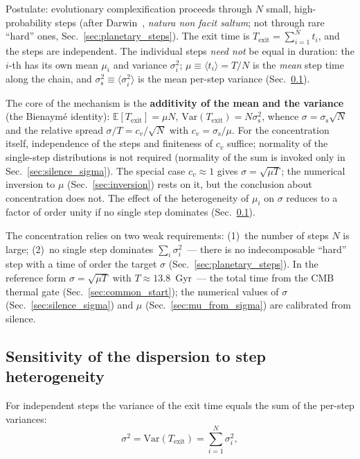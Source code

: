 \documentclass[11pt,a4paper]{article}
\begin{document}
Postulate: evolutionary complexification proceeds through $N$ small, high-probability steps (after Darwin~\cite{Darwin1859}, \emph{natura non facit saltum}; not through rare ``hard'' ones, Sec.~\ref{sec:planetary_steps}). The exit time is $T_{\mathrm{exit}} = \sum_{i=1}^{N} t_i$, and the steps are independent. The individual steps \emph{need not} be equal in duration: the $i$-th has its own mean $\mu_i$ and variance $\sigma_i^2$; $\mu \equiv \langle t_i\rangle = T/N$ is the \emph{mean} step time along the chain, and $\sigma_{\mathrm{s}}^2 \equiv \langle\sigma_i^2\rangle$ is the mean per-step variance (Sec.~\ref{sec:heterogeneity}).

The core of the mechanism is the \textbf{additivity of the mean and the variance} (the Bienaymé identity): $\mathbb{E}[T_{\mathrm{exit}}] = \mu N$, $\mathrm{Var}(T_{\mathrm{exit}}) = N\sigma_{\mathrm{s}}^2$, whence $\sigma = \sigma_{\mathrm{s}}\sqrt{N}$ and the relative spread $\sigma/T = c_v/\sqrt{N}$ with $c_v = \sigma_{\mathrm{s}}/\mu$. For the concentration itself, independence of the steps and finiteness of $c_v$ suffice; normality of the single-step distributions is not required (normality of the sum is invoked only in Sec.~\ref{sec:silence_sigma}). The special case $c_v \approx 1$ gives $\sigma = \sqrt{\mu T}$; the numerical inversion to $\mu$ (Sec.~\ref{sec:inversion}) rests on it, but the conclusion about concentration does not. The effect of the heterogeneity of $\mu_i$ on $\sigma$ reduces to a factor of order unity if no single step dominates (Sec.~\ref{sec:heterogeneity}).

The concentration relies on two weak requirements: (1)~the number of steps $N$ is large; (2)~no single step dominates $\sum_i\sigma_i^2$~--- there is no indecomposable ``hard'' step with a time of order the target $\sigma$ (Sec.~\ref{sec:planetary_steps}). In the reference form $\sigma = \sqrt{\mu T}$ with $T \approx 13.8$~Gyr~--- the total time from the CMB thermal gate (Sec.~\ref{sec:common_start}); the numerical values of $\sigma$ (Sec.~\ref{sec:silence_sigma}) and $\mu$ (Sec.~\ref{sec:mu_from_sigma}) are calibrated from silence.

\subsection{Sensitivity of the dispersion to step heterogeneity}
\label{sec:heterogeneity}

For independent steps the variance of the exit time equals the sum of the per-step variances:
\begin{equation}
\sigma^2 = \mathrm{Var}(T_{\mathrm{exit}}) = \sum_{i=1}^{N}\sigma_i^2,
\label{eq:varsum}
\end{equation}
\end{document}
